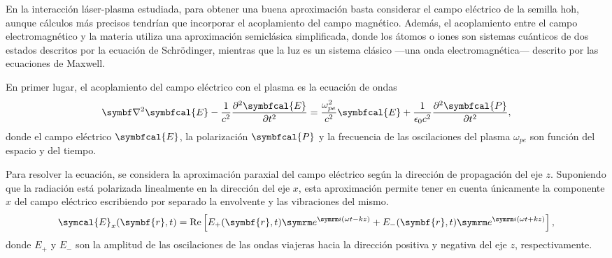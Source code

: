 En la interacción láser-plasma estudiada, para obtener una buena aproximación basta considerar el campo eléctrico de la semilla \acrshort{hoh}, aunque cálculos más precisos tendrían que incorporar el acoplamiento del campo magnético. Además, el acoplamiento entre el campo electromagnético y la materia utiliza una aproximación semiclásica simplificada, donde los átomos o iones son sistemas cuánticos de dos estados descritos por la ecuación de Schrödinger, mientras que la luz es un sistema clásico ---una onda electromagnética--- descrito por las ecuaciones de Maxwell.

En primer lugar, el acoplamiento del campo eléctrico con el plasma es la ecuación de ondas 
\begin{equation}\label{eq:3.1}
    \grad^2 {\symbfcal{E}} - \frac{1}{c^2}\frac{\partial^2 {\symbfcal{E}}}{\partial t^2} = 
    \frac{\omega_{pe}^2}{c^2}{\symbfcal{E}} + \frac{1}{\epsilon_0 c^2}\frac{\partial^2 {\symbfcal{P}}}{\partial t^2},
\end{equation}
\noindent
donde el campo eléctrico ${\symbfcal{E}}$, la polarización ${\symbfcal{P}}$ y la frecuencia de las oscilaciones del plasma $\omega_{pe}$ son función del espacio y del tiempo.

Para resolver la ecuación, se considera la aproximación paraxial del campo eléctrico según la dirección de propagación del eje $z$. Suponiendo que la radiación está polarizada linealmente en la dirección del eje $x$, esta aproximación permite tener en cuenta únicamente la componente $x$ del campo eléctrico escribiendo por separado la envolvente y las vibraciones del mismo.
\begin{equation}\label{eq:3.2}
    \symcal{E}_x(\symbf{r},t) 
    =
    \RE\left[E_+(\symbf{r},t)\eu^{\iu(\omega t - kz)}+E_-(\symbf{r},t)\eu^{\iu(\omega t + kz)}\right],
\end{equation}
\noindent
donde $E_+$ y $E_-$ son la amplitud de las oscilaciones de las ondas viajeras hacia la dirección positiva y negativa del eje $z$, respectivamente. 

